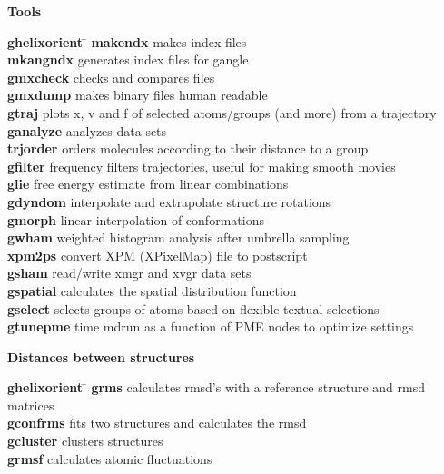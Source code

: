 \begin{description}
\item {\large\bf Tools}
\vspace{-2ex}\begin{tabbing}
{\bf g\us{}helixorient} \= \kill
{\bf make\us{}ndx} \> makes index files \\
{\bf mk\us{}angndx} \> generates index files for g\us{}angle \\
{\bf gmxcheck} \> checks and compares files \\
{\bf gmxdump} \> makes binary files human readable \\
{\bf g\us{}traj} \> plots x, v and f of selected atoms/groups (and more) from a trajectory \\
{\bf g\us{}analyze} \> analyzes data sets \\
{\bf trjorder} \> orders molecules according to their distance to a group \\
{\bf g\us{}filter} \> frequency filters trajectories, useful for making smooth movies \\
{\bf g\us{}lie} \> free energy estimate from linear combinations \\
{\bf g\us{}dyndom} \> interpolate and extrapolate structure rotations \\
{\bf g\us{}morph} \> linear interpolation of conformations  \\
{\bf g\us{}wham} \> weighted histogram analysis after umbrella sampling \\
{\bf xpm2ps} \> convert XPM (XPixelMap) file to postscript \\
{\bf g\us{}sham} \> read/write xmgr and xvgr data sets \\
{\bf g\us{}spatial} \> calculates the spatial distribution function \\
{\bf g\us{}select} \> selects groups of atoms based on flexible textual selections \\
{\bf g\us{}tune\us{}pme} \> time mdrun as a function of PME nodes to optimize settings \\
\end{tabbing}\vspace{-2ex}

\item {\large\bf Distances between structures}
\vspace{-2ex}\begin{tabbing}
{\bf g\us{}helixorient} \= \kill
{\bf g\us{}rms} \> calculates rmsd's with a reference structure and rmsd matrices \\
{\bf g\us{}confrms} \> fits two structures and calculates the rmsd  \\
{\bf g\us{}cluster} \> clusters structures \\
{\bf g\us{}rmsf} \> calculates atomic fluctuations \\
\end{tabbing}\vspace{-2ex}


\end{description}
